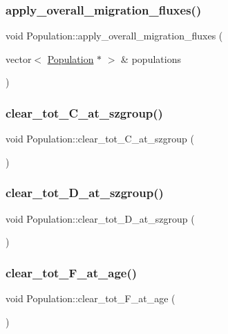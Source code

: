 \subsubsection{\texorpdfstring{apply\_overall\_migration\_fluxes()}{apply\_overall\_migration\_fluxes()}}
{\footnotesize\ttfamily void Population\+::apply\+\_\+overall\+\_\+migration\+\_\+fluxes (\begin{DoxyParamCaption}\item[{vector$<$ \mbox{\hyperlink{class_population}{Population}} $\ast$ $>$ \&}]{populations }\end{DoxyParamCaption})}

\mbox{\label{class_population_a76b64f23119ccb0f397a98a6a41f980a}} 
\subsubsection{\texorpdfstring{clear\_tot\_C\_at\_szgroup()}{clear\_tot\_C\_at\_szgroup()}}
{\footnotesize\ttfamily void Population\+::clear\+\_\+tot\+\_\+\+C\+\_\+at\+\_\+szgroup (\begin{DoxyParamCaption}{ }\end{DoxyParamCaption})}

\mbox{\label{class_population_a635315f1caef18e1dc73e2f25feb16b2}} 
\subsubsection{\texorpdfstring{clear\_tot\_D\_at\_szgroup()}{clear\_tot\_D\_at\_szgroup()}}
{\footnotesize\ttfamily void Population\+::clear\+\_\+tot\+\_\+\+D\+\_\+at\+\_\+szgroup (\begin{DoxyParamCaption}{ }\end{DoxyParamCaption})}

\mbox{\label{class_population_a6526e780c4db4034a1b719099daabaf4}} 
\subsubsection{\texorpdfstring{clear\_tot\_F\_at\_age()}{clear\_tot\_F\_at\_age()}}
{\footnotesize\ttfamily void Population\+::clear\+\_\+tot\+\_\+\+F\+\_\+at\+\_\+age (\begin{DoxyParamCaption}{ }\end{DoxyParamCaption})}

